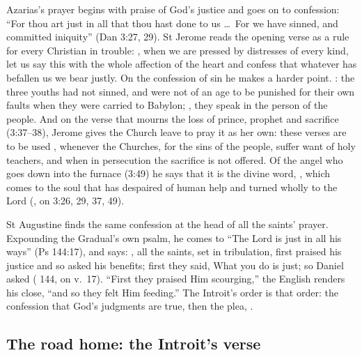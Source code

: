 Azarias's prayer begins with praise of God's justice and goes on to confession:
``For thou art just in all that thou hast done to us \dots\ For we have sinned,
and committed iniquity'' (Dan 3:27, 29). St Jerome reads the opening verse as a
rule for every Christian in trouble: , when we are pressed by distresses of every kind, let us say
this with the whole affection of the heart and confess that whatever has
befallen us we bear justly. On the confession of sin he makes a harder point.
: the three youths had not sinned,
and were not of an age to be punished for their own faults when they were
carried to Babylon; , they speak
in the person of the people. And on the verse that mourns the loss of prince,
prophet and sacrifice (3:37--38), Jerome gives the Church leave to pray it as
her own: these verses are to be used , whenever the Churches, for the sins of the people,
suffer want of holy teachers, and when in persecution the sacrifice is not
offered. Of the angel who goes down into the furnace (3:49) he says that it is
the divine word, , which comes to the soul that has
despaired of human help and turned wholly to the Lord (, on 3:26, 29, 37, 49).

St Augustine finds the same confession at the head of all the saints' prayer.
Expounding the Gradual's own psalm, he comes to ``The Lord is just in all his
ways'' (Ps 144:17), and says: , all the saints, set in
tribulation, first praised his justice and so asked his benefits; first they
said, What you do is just; so Daniel asked ( 144,
on v.~17). ``First they praised Him scourging,'' the English renders his close,
``and so they felt Him feeding.'' The Introit's order is that order: the
confession that God's judgments are true, then the plea, .

\subsection{The road home: the Introit's verse}

